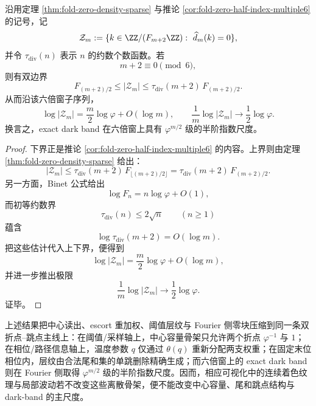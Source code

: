 \begin{theorem}\label{thm:xi-time-part70b-dark-band-half-order-scale}
沿用定理 \ref{thm:fold-zero-density-sparse} 与推论 \ref{cor:fold-zero-half-index-multiple6} 的记号，记
\[
\mathcal Z_m:=\{k\in \ZZ/(F_{m+2}\ZZ):\ \widehat d_m(k)=0\},
\]
并令 \(\tau_{\mathrm{div}}(n)\) 表示 \(n\) 的约数个数函数。若
\[
m+2\equiv 0\pmod 6,
\]
则有双边界
\[
F_{(m+2)/2}
\le
|\mathcal Z_m|
\le
\tau_{\mathrm{div}}(m+2)\,F_{(m+2)/2}.
\]
从而沿该六倍窗子序列，
\[
\log|\mathcal Z_m|
=
\frac{m}{2}\log\varphi+O(\log m),
\qquad
\frac{1}{m}\log|\mathcal Z_m|
\longrightarrow
\frac12\log\varphi.
\]
换言之，exact dark band 在六倍窗上具有 \(\varphi^{m/2}\) 级的半阶指数尺度。
\end{theorem}
\begin{proof}
下界正是推论 \ref{cor:fold-zero-half-index-multiple6} 的内容。上界则由定理 \ref{thm:fold-zero-density-sparse} 给出：
\[
|\mathcal Z_m|
\le
\tau_{\mathrm{div}}(m+2)\,F_{\lfloor (m+2)/2\rfloor}
=
\tau_{\mathrm{div}}(m+2)\,F_{(m+2)/2}.
\]
另一方面，Binet 公式给出
\[
\log F_n=n\log\varphi+O(1),
\]
而初等约数界
\[
\tau_{\mathrm{div}}(n)\le 2\sqrt n
\qquad (n\ge 1)
\]
蕴含
\[
\log\tau_{\mathrm{div}}(m+2)=O(\log m).
\]
把这些估计代入上下界，便得到
\[
\log|\mathcal Z_m|
=
\frac{m}{2}\log\varphi+O(\log m),
\]
并进一步推出极限
\[
\frac{1}{m}\log|\mathcal Z_m|\to \frac12\log\varphi.
\]
证毕。
\end{proof}

\noindent
上述结果把中心读出、escort 重加权、阈值层纹与 Fourier 侧零块压缩到同一条双折点--跳点主线上：在阈值/采样轴上，中心容量骨架只允许两个折点 \(\varphi^{-1}\) 与 \(1\)；在相位/路径信息轴上，温度参数 \(q\) 仅通过 \(\theta(q)\) 重新分配两支权重；在固定末位相位内，层纹由合法尾和集的单跳删除精确生成；而六倍窗上的 exact dark band 则在 Fourier 侧取得 \(\varphi^{m/2}\) 级的半阶指数尺度。因而，相应可视化中的连续着色纹理与局部波动若不改变这些离散骨架，便不能改变中心容量、尾和跳点结构与 dark-band 的主尺度。

\endinput
